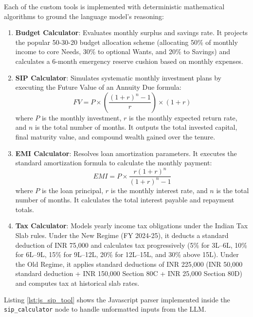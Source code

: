 Each of the custom tools is implemented with deterministic mathematical algorithms to ground the language model's reasoning:
\begin{enumerate}
    \item \textbf{Budget Calculator}: Evaluates monthly surplus and savings rate. It projects the popular 50-30-20 budget allocation scheme (allocating 50\% of monthly income to core Needs, 30\% to optional Wants, and 20\% to Savings) and calculates a 6-month emergency reserve cushion based on monthly expenses.
    \item \textbf{SIP Calculator}: Simulates systematic monthly investment plans by executing the Future Value of an Annuity Due formula:
    \[
    FV = P \times \left( \frac{(1 + r)^n - 1}{r} \right) \times (1 + r)
    \]
    where $P$ is the monthly investment, $r$ is the monthly expected return rate, and $n$ is the total number of months. It outputs the total invested capital, final maturity value, and compound wealth gained over the tenure.
    \item \textbf{EMI Calculator}: Resolves loan amortization parameters. It executes the standard amortization formula to calculate the monthly payment:
    \[
    EMI = P \times \frac{r(1+r)^n}{(1+r)^n - 1}
    \]
    where $P$ is the loan principal, $r$ is the monthly interest rate, and $n$ is the total number of months. It calculates the total interest payable and repayment totals.
    \item \textbf{Tax Calculator}: Models yearly income tax obligations under the Indian Tax Slab rules. Under the New Regime (FY 2024-25), it deducts a standard deduction of INR 75,000 and calculates tax progressively (5\% for 3L--6L, 10\% for 6L--9L, 15\% for 9L--12L, 20\% for 12L--15L, and 30\% above 15L). Under the Old Regime, it applies standard deductions of INR 225,000 (INR 50,000 standard deduction + INR 150,000 Section 80C + INR 25,000 Section 80D) and computes tax at historical slab rates.
\end{enumerate}

Listing \ref{lst:js_sip_tool} shows the Javascript parser implemented inside the \texttt{sip\_calculator} node to handle unformatted inputs from the LLM.

